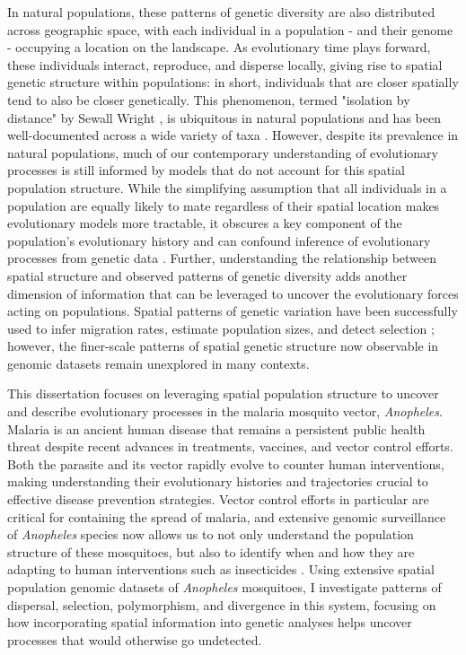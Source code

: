 In natural populations, these patterns of genetic diversity are also distributed across geographic space, 
with each individual in a population - and their genome - occupying a location on the landscape. 
As evolutionary time plays forward, these individuals interact, reproduce, and disperse locally, giving rise to spatial 
genetic structure within populations: in short, individuals that are closer spatially tend to also be closer genetically.
This phenomenon, termed "isolation by distance" by Sewall Wright \citep{wright1946isolation}, is ubiquitous in natural populations
and has been well-documented across a wide variety of taxa \citep{xue2021discovery, schlenke2004strong}.
However, despite its prevalence in natural populations, much of our contemporary understanding of
evolutionary processes is still informed by models that do not account for this spatial population structure.
While the simplifying assumption that all individuals in a population are equally likely to mate regardless
of their spatial location makes evolutionary models more tractable, it obscures a key component of the population's
evolutionary history and can confound inference of evolutionary processes from genetic data \citep{bradburd2019spatial}.
Further, understanding the relationship between spatial structure and 
observed patterns of genetic diversity adds another dimension of information that can be leveraged to uncover
the evolutionary forces acting on populations. 
Spatial patterns of genetic variation have been successfully used to infer migration rates, estimate population sizes, and
detect selection \citep{Muktupavela_Petr_Ségurel_Korneliussen_Novembre_Racimo_2022, Patterson_Goodfellow_Ting_Kern_Ralph_2026, Smith_Patterson_Ralph_Kern_2024};
however, the finer-scale patterns of spatial genetic structure now observable in genomic datasets remain unexplored in many contexts.



This dissertation focuses on leveraging spatial population structure to uncover and describe evolutionary processes 
in the malaria mosquito vector, \textit{Anopheles}.
Malaria is an ancient human disease that remains a persistent public health threat despite recent advances in 
treatments, vaccines, and vector control efforts.
Both the parasite and its vector rapidly evolve to counter human interventions, making understanding their 
evolutionary histories and trajectories crucial to effective disease prevention strategies.
Vector control efforts in particular are critical for containing the spread of malaria,
and extensive genomic surveillance of \textit{Anopheles} species now allows us to not only understand 
the population structure of these mosquitoes, but also to identify when and how they are adapting to human interventions
such as insecticides \citep{anopheles2017genetic, consortium_genome_2020}.
Using extensive spatial population genomic datasets of \textit{Anopheles} mosquitoes, I 
investigate patterns of dispersal, selection, polymorphism, and divergence in this system,
focusing on how incorporating spatial information into genetic analyses helps uncover processes that would otherwise go undetected.

